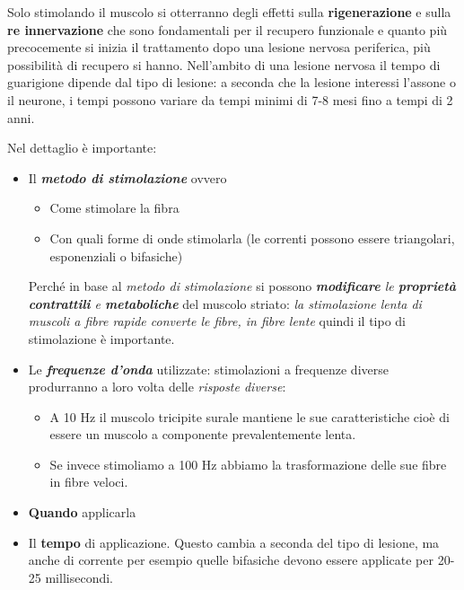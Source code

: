 Solo stimolando il muscolo si otterranno degli effetti sulla
\textbf{rigenerazione} e sulla \textbf{re innervazione} che sono
fondamentali per il recupero funzionale e quanto più precocemente si
inizia il trattamento dopo una lesione nervosa periferica, più
possibilità di recupero si hanno. Nell'ambito di una lesione nervosa il
tempo di guarigione dipende dal tipo di lesione: a seconda che la
lesione interessi l'assone o il neurone, i tempi possono variare da
tempi minimi di 7-8 mesi fino a tempi di 2 anni.

Nel dettaglio è importante:

\begin{itemize}
\item
  Il \textbf{\emph{metodo di stimolazione}} ovvero

\begin{itemize}
\item
  Come stimolare la fibra
\item
  Con quali forme di onde stimolarla (le correnti possono essere
  triangolari, esponenziali o bifasiche)
\end{itemize}

Perché in base al \emph{metodo di stimolazione} si possono
\emph{\textbf{modificare} le \textbf{proprietà contrattili} e
\textbf{metaboliche}} del muscolo striato: \emph{la stimolazione lenta
di muscoli a fibre rapide converte le fibre, in fibre lente} quindi il
tipo di stimolazione è importante.

\item
  Le \textbf{\emph{frequenze d'onda}} utilizzate: stimolazioni a
  frequenze diverse produrranno a loro volta delle \emph{risposte
  diverse}:

\begin{itemize}
\item
  A 10 Hz il muscolo tricipite surale mantiene le sue caratteristiche
  cioè di essere un muscolo a componente prevalentemente lenta.
\item
  Se invece stimoliamo a 100 Hz abbiamo la trasformazione delle sue
  fibre in fibre veloci.
\end{itemize}

\item
  \textbf{Quando} applicarla
\item
  Il \textbf{tempo} di applicazione. Questo cambia a seconda del tipo di
  lesione, ma anche di corrente per esempio quelle bifasiche devono
  essere applicate per 20-25 millisecondi.
\end{itemize}

